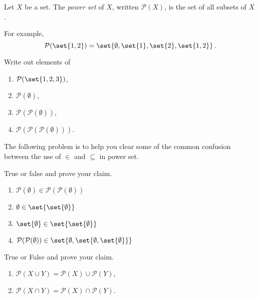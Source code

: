 \documentclass[12pt]{amsart}
\begin{document}
\begin{definition}
    Let $X$ be a set. The \emph{power set} of $X$, written $\mathcal{P}(X)$, is the set of all subsets of $X$.

    For example, $$\mathcal{P}(\set{1,2}) = \set{ \emptyset, \set{1}, \set{2}, \set{1,2}}\,.$$ 
\end{definition}

\begin{problem}
    Write out elements of
    \begin{enumerate}
        \item  $\mathcal{P}(\set{1,2,3})$,
        \item $\mathcal{P}(\emptyset)$,
        \item $\mathcal{P}(\mathcal{P}(\emptyset))$,
        \item $\mathcal{P}(\mathcal{P}(\mathcal{P}(\emptyset)))$.
    \end{enumerate}
\end{problem}

The following problem is to help you clear some of the common confusion between 
the use of $\in$ and $\subseteq$ in power set.

\begin{problem}
    True or false and prove your claim.

    \begin{enumerate}
        \item $\mathcal{P}(\emptyset) \in \mathcal{P}(\mathcal{P}(\emptyset))$
        \item $\emptyset \in \set{\set{\emptyset}}$
        \item $\set{\emptyset} \in \set{\set{\emptyset}}$
        \item $\mathcal{P}(\mathcal{P}(\emptyset)) \in \set{\emptyset, \set{\emptyset, \set{\emptyset}}}$
    \end{enumerate}
\end{problem}

\begin{problem}
    True or False and prove your claim.
    \begin{enumerate}
        \item $\mathcal{P}(X\cup Y) = \mathcal{P}(X) \cup \mathcal{P}(Y)$,
        \item $\mathcal{P}(X\cap Y) = \mathcal{P}(X) \cap \mathcal{P}(Y)$.
    \end{enumerate}
\end{problem}
\end{document}
